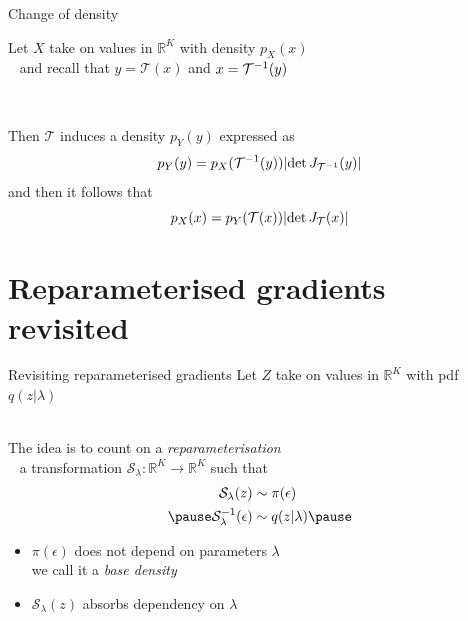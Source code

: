 \begin{frame}{Change of density}

Let $X$ take on values in $\mathbb R^K$ with density $p_X(x)$\\ \pause
~ and recall that $y = \mathcal T(x)$ and $x = {\mathcal T}^{-1}(y)$\\ \pause

~

Then $\mathcal T$ induces a density $p_Y(y)$ expressed as
\begin{equation*}
p_Y(y) = p_X({\mathcal T}^{-1}(y)) \abs{\det J_{{\mathcal T}^{-1}}(y)}
\end{equation*} \pause
and then it follows that
\begin{equation*}
p_X(x) = p_Y(\mathcal T(x)) \abs{\det J_{\mathcal T}(x)}
\end{equation*}

	
\end{frame}

\section{Reparameterised gradients revisited}

\begin{frame}{Revisiting reparameterised gradients}
	Let $Z$ take on values in $\mathbb R^K$ with pdf $q(z|\lambda)$ \\
	
	~ \pause

	The idea is to count on a \emph{reparameterisation} \\ \pause
	~ a transformation $\mathcal S_\lambda: \mathbb R^K \to \mathbb R^K$ such that \pause
	\begin{equation*}
	\begin{aligned}
	\mathcal S_\lambda(z) &\sim \pi(\epsilon) \\ \pause
 	\inv{\mathcal S}_\lambda(\epsilon) &\sim q(z|\lambda) \pause
	\end{aligned}
	\end{equation*} 
	\begin{itemize}
		\item $\pi(\epsilon)$ does not depend on parameters $\lambda$\\
		we call it a \emph{base density} \pause
		\item $\mathcal S_\lambda(z)$ absorbs dependency on $\lambda$ 
	\end{itemize}

\end{frame}

